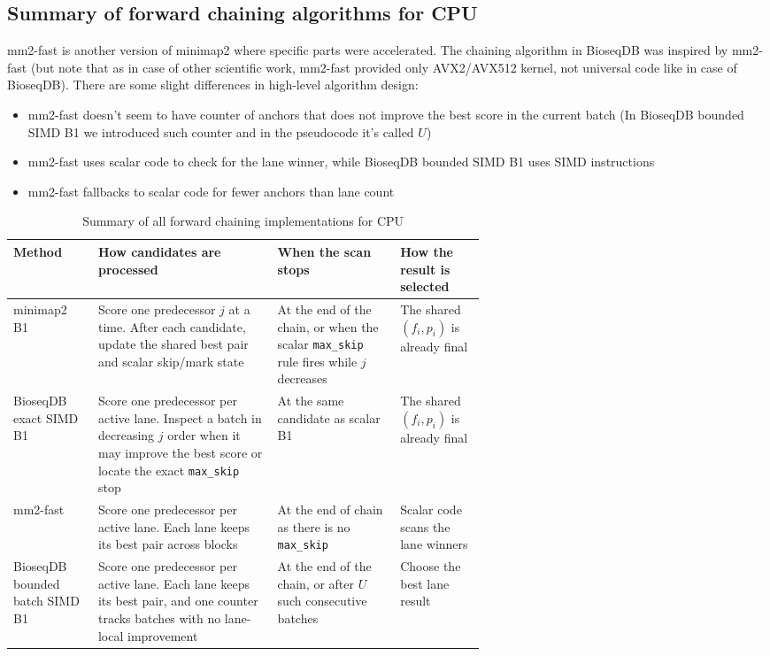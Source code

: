 \clearpage
\subsection{Summary of forward chaining algorithms for CPU}
\label{sec:chaining-mm2-fast-forward}

mm2-fast is another version of minimap2 where specific parts were accelerated. The chaining algorithm in BioseqDB was inspired by mm2-fast (but note that as in case of other scientific work, mm2-fast provided only AVX2/AVX512 kernel, not universal code like in case of BioseqDB).
There are some slight differences in high-level algorithm design:
\begin{itemize}
    \item mm2-fast doesn't seem to have counter of anchors that does not improve the best score in the current batch (In BioseqDB bounded SIMD B1 we introduced such counter and in the pseudocode it's called $U$)
    \item mm2-fast uses scalar code to check for the lane winner, while BioseqDB bounded SIMD B1 uses SIMD instructions
    \item mm2-fast fallbacks to scalar code for fewer anchors than lane count
\end{itemize}

\begin{table}[H]
\centering
\caption{Summary of all forward chaining implementations for CPU}
\label{tab:chaining-mm2-fast-forward}
\footnotesize
\setlength{\tabcolsep}{3.0pt}
\renewcommand{\arraystretch}{1.12}
\begin{tabularx}{\linewidth}{@{}
  >{\raggedright\arraybackslash}p{0.18\linewidth}
  >{\raggedright\arraybackslash}X
  >{\raggedright\arraybackslash}p{0.26\linewidth}
  >{\raggedright\arraybackslash}p{0.18\linewidth}@{}}
\toprule
\textbf{Method} &
\textbf{How candidates are processed} &
\textbf{When the scan stops} &
\textbf{How the result is selected}\\
\midrule
minimap2 B1 &
Score one predecessor \(j\) at a time.  After each candidate, update the
shared best pair and scalar skip/mark state &
At the end of the chain, or when the scalar \texttt{max\_skip} rule
fires while \(j\) decreases &
The shared \((f_i,p_i)\) is already final\\
\addlinespace
BioseqDB exact SIMD B1 &
Score one predecessor per active lane.  Inspect a batch in decreasing \(j\)
order when it may improve the best score or locate the exact
\texttt{max\_skip} stop &
At the same candidate as scalar B1 &
The shared \((f_i,p_i)\) is already final\\
\addlinespace
mm2-fast &
Score one predecessor per active lane.  Each lane keeps its best pair across
blocks &
At the end of chain as there is no \texttt{max\_skip} &
Scalar code scans the lane winners\\
\addlinespace
BioseqDB bounded batch SIMD B1 &
Score one predecessor per active lane.  Each lane keeps its best pair, and
one counter tracks batches with no lane-local improvement &
At the end of the chain, or after \(U\) such consecutive batches &
Choose the best lane result\\
\bottomrule
\end{tabularx}
\end{table}

